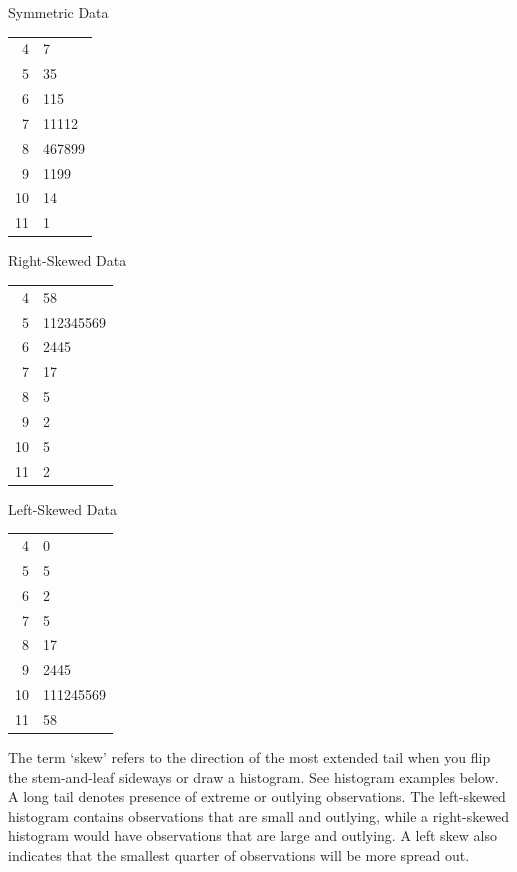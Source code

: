 \documentclass[11pt, chapterprefix=true]{scrbook}\usepackage[]{graphicx}\usepackage[]{color}
\begin{document}
\begin{minipage}[ht]{5cm}

Symmetric Data



\begin{tabular}{@{} r|l @{}} \hline
4 & 7 \\
5 & 35 \\
6 & 115 \\
7 & 11112 \\
8 & 467899 \\
9 & 1199 \\
10 & 14 \\
11 & 1 \\ \hline
\end{tabular}
\end{minipage}
\begin{minipage}[ht]{5cm}

Right-Skewed Data



\begin{tabular}{@{} r|l @{}} \hline
4 & 58 \\
5 & 112345569 \\
6 & 2445 \\
7 & 17 \\
8 & 5 \\
9 & 2 \\
10 & 5 \\
11 & 2 \\ \hline
\end{tabular}
\end{minipage}
\begin{minipage}[ht]{5cm}

Left-Skewed Data




\begin{tabular}{@{} r|l} \hline
4 & 0 \\
5 & 5 \\
6 & 2 \\
7 & 5\\
8 & 17 \\
9 & 2445 \\
10 & 111245569 \\
11 & 58 \\ \hline
\end{tabular}
\end{minipage}

\vspace{1cm}

The term `skew' refers to the direction of the most extended tail when you flip the stem-and-leaf sideways or draw a histogram. See histogram examples below. A long tail denotes presence of extreme or outlying observations.  The left-skewed histogram contains observations that are small and outlying, while a right-skewed histogram would have observations that are large and outlying.  A left skew also indicates that the smallest quarter of observations will be more spread out.
\end{document}
